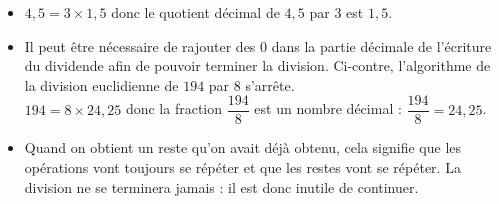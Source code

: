 \begin{Exemples}
\begin{minipage}[c]{0.55\textwidth}
\begin{itemize}[label=\textcolor{Couleur8}{$\bullet$}]
\item $4,5 = 3 \times 1,5$ donc le quotient décimal de $4,5$ par $3$ est $1,5$.
\item Il peut être nécessaire de rajouter des $0$ dans la partie décimale de l'écriture du dividende afin de pouvoir terminer la division. Ci-contre, l'algorithme de la division euclidienne de $194$ par $8$ s'arrête.\\
$194 = 8 \times 24,25$ donc la fraction $\dfrac{194}{8}$ est un nombre décimal : $\dfrac{194}{8} = 24,25$.
\end{itemize}
\end{minipage} \hfill \begin{minipage}[c]{0.45\textwidth}
\begin{center}
\end{center}
\end{minipage}

\begin{itemize}[label=\textcolor{Couleur8}{$\bullet$}]
\item Quand on obtient un reste qu'on avait déjà obtenu, cela signifie que les opérations vont toujours se répéter et que les restes vont se répéter. La division ne se terminera jamais : il est donc inutile de continuer.\\


\begin{center}
\end{center}
\end{itemize}
\end{Exemples}
